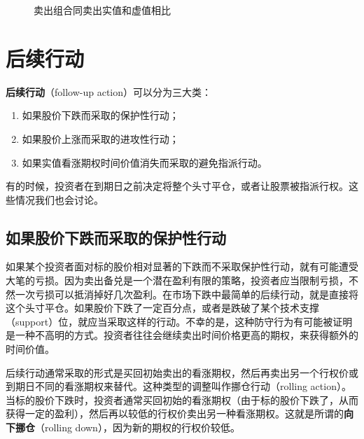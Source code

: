 \begin{figure}
    \centering
    \caption{卖出组合同卖出实值和虚值相比}
    \label{fig2.2}
\end{figure}

\section{后续行动}
\textbf{后续行动}（follow-up action）可以分为三大类：
\begin{enumerate}
    \item 如果股价下跌而采取的保护性行动；
    \item 如果股价上涨而采取的进攻性行动；
    \item 如果实值看涨期权时间价值消失而采取的避免指派行动。
\end{enumerate}
有的时候，投资者在到期日之前决定将整个头寸平仓，或者让股票被指派行权。这些情况我们也会讨论。
\subsection{如果股价下跌而采取的保护性行动}
如果某个投资者面对标的股价相对显著的下跌而不采取保护性行动，就有可能遭受大笔的亏损。因为卖出备兑是一个潜在盈利有限的策略，投资者应当限制亏损，不然一次亏损可以抵消掉好几次盈利。在市场下跌中最简单的后续行动，就是直接将这个头寸平仓。如果股价下跌了一定百分点，或者是跌破了某个技术支撑（support）位，就应当采取这样的行动。不幸的是，这种防守行为有可能被证明是一种不高明的方式。投资者往往会继续卖出时间价格更高的期权，来获得额外的时间价值。

后续行动通常采取的形式是买回初始卖出的看涨期权，然后再卖出另一个行权价或到期日不同的看涨期权来替代。这种类型的调整叫作挪仓行动（rolling action）。当标的股价下跌时，投资者通常买回初始的看涨期权（由于标的股价下跌了，从而获得一定的盈利），然后再以较低的行权价卖出另一种看涨期权。这就是所谓的\textbf{向下挪仓}（rolling down），因为新的期权的行权价较低。

